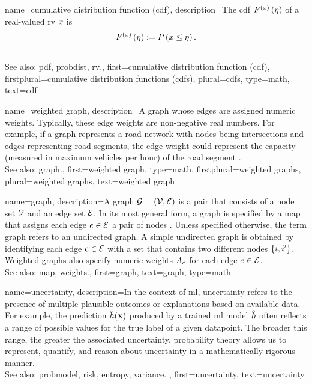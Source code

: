 {name={cumulative distribution function (cdf)},
	description={The  cdf 
	$F^{(x)}\left(\eta\right)$ of a real-valued \gls{rv} $x$ is \cite{AshProbMeasure,papoulis}
	$$F^{(x)}\left(\eta\right) := P\left(x \leq \eta\right).$$
					\\ 
		See also: \gls{pdf}, \gls{probdist}, \gls{rv}.},
	first={cumulative distribution function (cdf)},
	firstplural={cumulative distribution functions (cdfs)}, 
	plural={cdfs}, 
	type=math,
	text={cdf} 
}

{name={weighted graph},
	description={A \gls{graph} whose edges 
	are assigned numeric weights. Typically, these edge weights 
	are non-negative real numbers. For example, if a graph represents 
	a road network with nodes being intersections and edges representing 
	road segments, the edge weight could represent the capacity (measured 
	in maximum vehicles per hour) of the road segment \cite{NewmannBook}.  
					\\ 
		See also: \gls{graph}.},
	first={weighted graph},
	type=math,
	firstplural={weighted graphs}, 
	plural={weighted graphs}, 
	text={weighted graph} 
}



{name={graph},
 description={A graph $\mathcal{G} = \left( \mathcal{V},\mathcal{E} \right)$ 
 is a pair that consists of a node set $\mathcal{V}$ and an edge set $\mathcal{E}$. 
 In its most general form, a graph is specified by a \gls{map} that 
 assigns each edge $e \in \mathcal{E}$ a pair of nodes \cite{RockNetworks}. 
 Unless specified otherwise, the term graph refers to an undirected graph. 
 A simple undirected graph is obtained by identifying each edge $e \in \mathcal{E}$ 
 with a set that contains two different nodes $\{i,i'\}$. 
 Weighted graphs also specify numeric \gls{weights} $A_{e}$ for each 
 edge $e \in \mathcal{E}$.
					\\ 
		See also: \gls{map}, \gls{weights}.},
 first={graph},
 text={graph}, 
 type=math
}

{name={uncertainty},
	description={In the context of \gls{ml}, uncertainty refers to the presence of multiple 
		plausible outcomes or \glspl{explanation} based on available \gls{data}. For example, the 
		\gls{prediction} $\hat{h}({\bf x})$ produced by a trained \gls{ml} \gls{model} $\hat{h}$
	 	often reflects a range of possible values for the true \gls{label} of a given \gls{datapoint}. 
	 	The broader this range, the greater the associated uncertainty. \Gls{probability} theory 
	 	allows us to represent, quantify, and reason about uncertainty in a 
	 	mathematically rigorous manner.
					\\ 
		See also: \gls{probmodel}, \gls{risk}, \gls{entropy}, \gls{variance}. },
	first={uncertainty},
	text={uncertainty}
}

